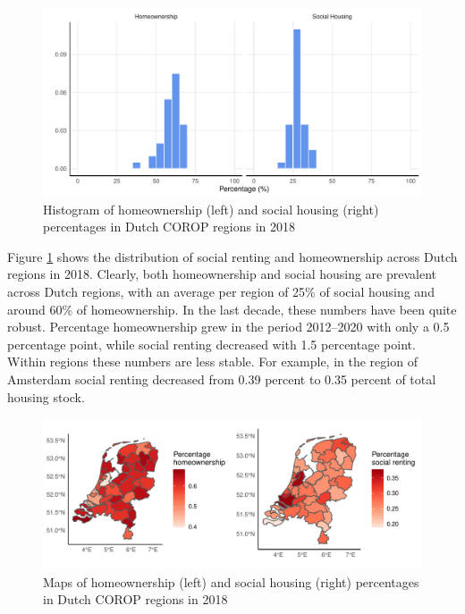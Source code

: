 \documentclass[11pt,parskip,abstracton,notitlepage, dvipsnames]{scrartcl}
\begin{document}
\begin{figure}[ht]\centering %
  \includegraphics[width=1.0\linewidth]{./../../fig/hist_housing_corop.pdf}
  \caption{Histogram of homeownership (left) and social housing (right)
    percentages in Dutch COROP regions in 2018}
  \label{fig:housing_mig}
\end{figure}

Figure \ref{fig:housing_mig} shows the distribution of social renting and
homeownership across Dutch regions in 2018. Clearly, both homeownership
and social housing are prevalent across Dutch regions, with an average
per region of 25\% of social housing and around 60\% of homeownership. In the last decade, these numbers have been quite robust. Percentage homeownership grew in the period 2012--2020 with only a 0.5 percentage point, while social renting decreased with 1.5 percentage point. Within regions these numbers are less stable. For example, in the region of Amsterdam social renting decreased from 0.39 percent to 0.35 percent of total housing stock.

\begin{figure}[ht]\centering %
  \includegraphics[width=1.0\linewidth]{./../../fig/housing_types.pdf}
  \caption{Maps of homeownership (left) and social housing (right)
    percentages in Dutch COROP regions in 2018 }
  \label{fig:housing_types}
\end{figure}
\end{document}
